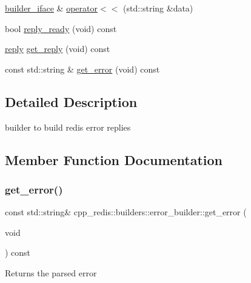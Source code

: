 \begin{DoxyCompactItemize}
\hyperlink{classcpp__redis_1_1builders_1_1builder__iface}{builder\+\_\+iface} \& \hyperlink{classcpp__redis_1_1builders_1_1error__builder_af5ac542be148d6f8500de79fa3164798}{operator$<$$<$} (std\+::string \&data)
\item 
bool \hyperlink{classcpp__redis_1_1builders_1_1error__builder_af3d67647f012d0a7378684e2f8258a6d}{reply\+\_\+ready} (void) const
\item 
\hyperlink{classcpp__redis_1_1reply}{reply} \hyperlink{classcpp__redis_1_1builders_1_1error__builder_ae2b68b7daad4d71b6780e47bdcc1e32b}{get\+\_\+reply} (void) const
\item 
const std\+::string \& \hyperlink{classcpp__redis_1_1builders_1_1error__builder_adeef989fb2f5e47e001783cfda48e341}{get\+\_\+error} (void) const
\end{DoxyCompactItemize}


\subsection{Detailed Description}
builder to build redis error replies 

\subsection{Member Function Documentation}
\mbox{\label{classcpp__redis_1_1builders_1_1error__builder_adeef989fb2f5e47e001783cfda48e341}} 
\subsubsection{\texorpdfstring{get\+\_\+error()}{get\_error()}}
{\footnotesize\ttfamily const std\+::string\& cpp\+\_\+redis\+::builders\+::error\+\_\+builder\+::get\+\_\+error (\begin{DoxyParamCaption}\item[{void}]{ }\end{DoxyParamCaption}) const}

\begin{DoxyReturn}{Returns}
the parsed error 
\end{DoxyReturn}
\mbox{\label{classcpp__redis_1_1builders_1_1error__builder_ae2b68b7daad4d71b6780e47bdcc1e32b}} 

